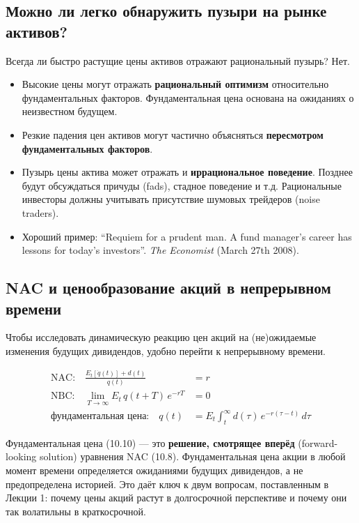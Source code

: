 \documentclass[10pt,a4paper]{article}
\begin{document}
\subsection{Можно ли легко обнаружить пузыри на рынке активов?}

Всегда ли быстро растущие цены активов отражают рациональный пузырь? Нет.
\begin{itemize}[leftmargin=1.3em]
\item Высокие цены могут отражать \textbf{рациональный оптимизм} относительно фундаментальных факторов. Фундаментальная цена основана на ожиданиях о неизвестном будущем.
\item Резкие падения цен активов могут частично объясняться \textbf{пересмотром фундаментальных факторов}.
\item Пузырь цены актива может отражать и \textbf{иррациональное поведение}. Позднее будут обсуждаться причуды (fads), стадное поведение и т.д. Рациональные инвесторы должны учитывать присутствие шумовых трейдеров (noise traders).
\item Хороший пример: ``Requiem for a prudent man. A fund manager's career has lessons for today's investors''. \textit{The Economist} (March 27th 2008).
\end{itemize}

\subsection{NAC и ценообразование акций в непрерывном времени}

Чтобы исследовать динамическую реакцию цен акций на (не)ожидаемые изменения будущих дивидендов, удобно перейти к непрерывному времени.
\begin{formulabox}
\begin{align}
\text{NAC:}\quad \frac{E_t[\dot q(t)] + d(t)}{q(t)} &= r \tag{10.8}\\
\text{NBC:}\quad \lim_{T\to\infty}E_t\, q(t+T)\,e^{-rT} &= 0 \tag{10.9}\\
\text{фундаментальная цена:}\quad q(t) &= E_t\int_{t}^{\infty} d(\tau)\,e^{-r(\tau-t)}\,d\tau \tag{10.10}
\end{align}
\end{formulabox}

\begin{intuition}
Фундаментальная цена (10.10) — это \textbf{решение, смотрящее вперёд} (forward-looking solution) уравнения NAC (10.8). Фундаментальная цена акции в любой момент времени определяется ожиданиями будущих дивидендов, а не предопределена историей. Это даёт ключ к двум вопросам, поставленным в Лекции 1: почему цены акций растут в долгосрочной перспективе и почему они так волатильны в краткосрочной.
\end{intuition}
\end{document}

